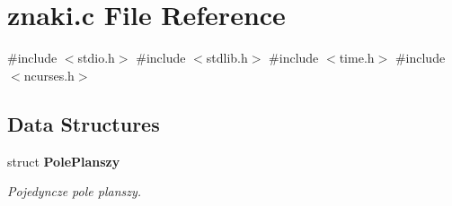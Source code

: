 \section{znaki.\+c File Reference}
\label{znaki_8c}
{\ttfamily \#include $<$stdio.\+h$>$}\newline
{\ttfamily \#include $<$stdlib.\+h$>$}\newline
{\ttfamily \#include $<$time.\+h$>$}\newline
{\ttfamily \#include $<$ncurses.\+h$>$}\newline
\subsection*{Data Structures}
\begin{DoxyCompactItemize}
\item 
struct \textbf{ Pole\+Planszy}
\begin{DoxyCompactList}\small\item\em Pojedyncze pole planszy. \end{DoxyCompactList}\end{DoxyCompactItemize}
